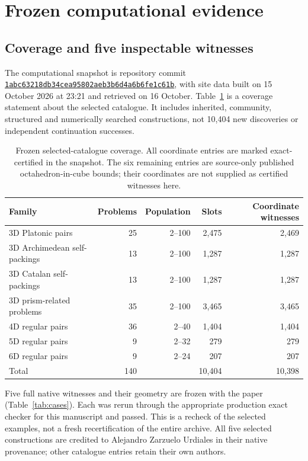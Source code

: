 \documentclass[11pt,a4paper]{article}
\newcommand{\code}[1]{\texttt{\nolinkurl{#1}}}
\newcommand{\frozen}{https://github.com/alejandrozu/platonic-packing/tree/1abc63218db34cea95802aeb3b6d4a6b6fe1c61b}
\begin{document}
\section{Frozen computational evidence}
\subsection{Coverage and five inspectable witnesses}
The computational snapshot is repository commit
\href{\frozen}{\code{1abc63218db34cea95802aeb3b6d4a6b6fe1c61b}}, with site data built on 15 October 2026 at 23:21 and retrieved on 16 October. Table~\ref{tab:coverage} is a coverage statement about the selected catalogue. It includes inherited, community, structured and numerically searched constructions, not 10,404 new discoveries or independent continuation successes.

\begin{table}[htbp]
\centering\small
\begin{tabular}{lrrrr}
\toprule
Family & Problems & Population & Slots & Coordinate witnesses\\
\midrule
3D Platonic pairs & 25 & 2--100 & 2,475 & 2,469\\
3D Archimedean self-packings & 13 & 2--100 & 1,287 & 1,287\\
3D Catalan self-packings & 13 & 2--100 & 1,287 & 1,287\\
3D prism-related problems & 35 & 2--100 & 3,465 & 3,465\\
4D regular pairs & 36 & 2--40 & 1,404 & 1,404\\
5D regular pairs & 9 & 2--32 & 279 & 279\\
6D regular pairs & 9 & 2--24 & 207 & 207\\
\midrule
Total & 140 & & 10,404 & 10,398\\
\bottomrule
\end{tabular}
\caption{Frozen selected-catalogue coverage. All coordinate entries are marked exact-certified in the snapshot. The six remaining entries are source-only published octahedron-in-cube bounds; their coordinates are not supplied as certified witnesses here.}
\label{tab:coverage}
\end{table}

Five full native witnesses and their geometry are frozen with the paper (Table~\ref{tab:cases}). Each was rerun through the appropriate production exact checker for this manuscript and passed. This is a recheck of the selected examples, not a fresh recertification of the entire archive. All five selected constructions are credited to Alejandro Zarzuelo Urdiales in their native provenance; other catalogue entries retain their own authors.
\end{document}
